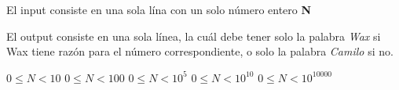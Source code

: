 \documentclass{oci}
\begin{document}
\begin{inputDescription}
El input consiste en una sola lína con un solo número entero \textbf{N}
\end{inputDescription}

\begin{outputDescription}
El output consiste en una sola línea, la cuál debe tener solo la palabra \textit{Wax} si Wax tiene razón para el número correspondiente, o solo la palabra \textit{Camilo} si no.
\end{outputDescription}

\begin{scoreDescription}
   $ 0 \le N < 10$
   $ 0 \le N < 100$
   $ 0 \le N < 10^5$
   $ 0 \le N < 10^{10}$
   $ 0 \le N < 10^{10000}$
\end{scoreDescription}

\begin{sampleDescription}
\end{sampleDescription}
\end{document}
